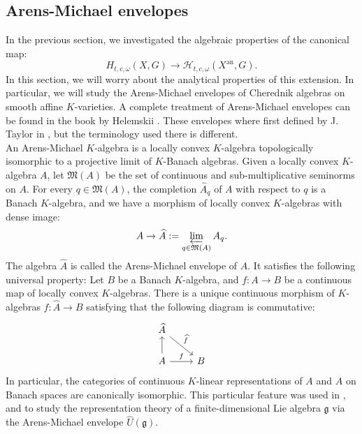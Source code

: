\documentclass{amsart}
\begin{document}
\subsection{Arens-Michael envelopes}\label{Section AM envelopes}
In the previous section, we investigated the algebraic properties of the canonical map:
\begin{equation*}
    H_{t,c,\omega}(X,G)\rightarrow \mathcal{H}_{t,c,\omega}(X^{\operatorname{an}},G).
\end{equation*}
In this section, we will worry about the analytical properties of this extension. In particular, we will study the Arens-Michael envelopes of Cherednik algebras on smooth affine $K$-varieties. A complete treatment of Arens-Michael envelopes can be found in the book by Helemskii \cite{Helemskiibook}. These envelopes where first defined by J. Taylor in \cite{TAYLOR1972183}, but the terminology used there is different.\\
An Arens-Michael $K$-algebra is a locally convex $K$-algebra
topologically isomorphic to a projective limit of $K$-Banach algebras. Given a locally convex $K$-algebra $A$, let $\mathfrak{M}(A)$  be the set of continuous and sub-multiplicative seminorms on $A$. For every $q\in \mathfrak{M}(A)$, the completion $\widehat{A}_q$ of $A$ with respect to $q$ is a Banach $K$-algebra, and we have a morphism of locally convex $K$-algebras with dense image:
\begin{equation*}
    A\rightarrow \widehat{A}:=\varprojlim_{q\in\mathfrak{M}(A)}A_q.
\end{equation*}
The algebra $\widehat{A}$ is called the Arens-Michael envelope of $A$. It satisfies the following universal property: Let $B$ be a Banach $K$-algebra, and $f:A\rightarrow B$ be a continuous map of locally convex $K$-algebras. There is a unique continuous morphism of $K$-algebras $\widehat{f}:\widehat{A}\rightarrow B$ satisfying that the following diagram is commutative:
\begin{equation*}
\begin{tikzcd}
\widehat{A} \arrow[rd, "\widehat{f}"] &   \\
A \arrow[r, "f"] \arrow[u]            & B
\end{tikzcd}
\end{equation*}
In particular, the categories of continuous $K$-linear representations of $A$ and $\widehat{A}$ on Banach spaces are canonically isomorphic. This particular feature was used in \cite{PirStabflat}, and \cite{schmidt2012stableflatnessnonarchimedeanhyperenveloping} to study the representation theory of a finite-dimensional Lie algebra $\mathfrak{g}$ via the Arens-Michael envelope $\widehat{U}(\mathfrak{g})$.\\
\end{document}
